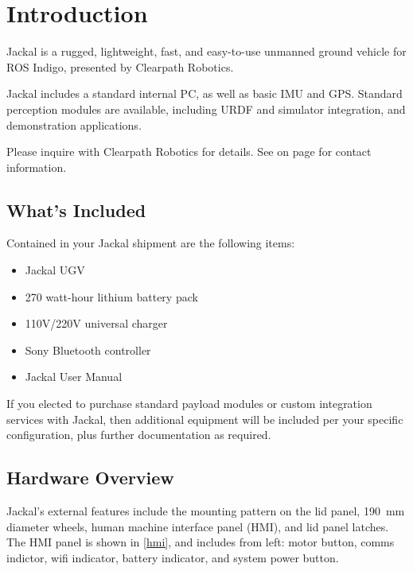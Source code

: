 \documentclass[]{clearpath-latex/clearpath-manual}
\begin{document}
\tableofcontents

\section{Introduction}

Jackal is a rugged, lightweight, fast, and easy-to-use unmanned ground vehicle for ROS
Indigo, presented by Clearpath Robotics.

Jackal includes a standard internal PC, as well as basic IMU and GPS. Standard
perception modules are available, including URDF and simulator integration, and
demonstration applications.

Please inquire with Clearpath Robotics for details. See  on page
\pageref{contact} for contact information.

\subsection{What's Included}

Contained in your Jackal shipment are the following items:

\begin{itemize}[nolistsep]
  \item Jackal UGV
  \item 270 watt-hour lithium battery pack
  \item 110V/220V universal charger
  \item Sony Bluetooth controller
  \item Jackal User Manual
\end{itemize}

If you elected to purchase standard payload modules or custom integration services with
Jackal, then additional equipment will be included per your specific configuration, plus
further documentation as required.

\subsection{Hardware Overview}

Jackal's external features include the mounting pattern on the lid panel, \SI{190}{\mm} diameter
wheels, human machine interface panel (HMI), and lid panel latches. The HMI panel is shown in
\autoref{hmi}, and includes from left: motor button, comms indictor, wifi indicator, battery
indicator, and system power button.

\end{document}
